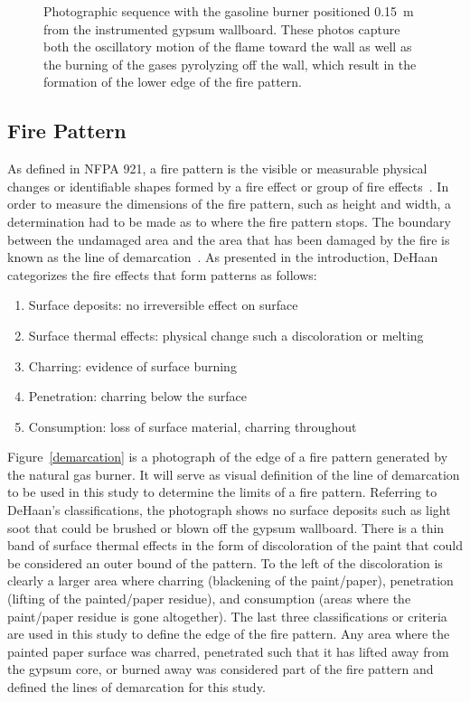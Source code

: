 \documentclass[twoside]{uocthesis}
\begin{document}
{\begin{figure}[p]
	\caption[Photographs of motion of the flame with the gasoline burner positioned 0.15~m from the wall]{Photographic sequence with the gasoline burner positioned 0.15~m from the instrumented gypsum wallboard. These photos capture both the oscillatory motion of the flame toward the wall as well as the burning of the gases pyrolyzing off  the wall, which result in the formation of the lower edge of the fire pattern.}
	\label{IWGBGAS6_seq}
\end{figure}

\subsection{Fire Pattern}

As defined in NFPA 921, a fire pattern is the visible or measurable physical changes or identifiable shapes formed by a fire effect or group of fire effects~\cite{NFPA:921}.  In order to measure the dimensions of the fire pattern, such as height and width, a determination had to be made as to where the fire pattern stops.  The boundary between the undamaged area and the area that has been damaged by the fire is known as the line of demarcation~\cite{NFPA:921}.  As presented in the introduction, DeHaan~\cite{DeHaan:2012} categorizes the fire effects that form patterns as follows:
\begin{enumerate}
	\item Surface deposits: no irreversible effect on surface
	\item Surface thermal effects: physical change such a discoloration or melting
	\item Charring: evidence of surface burning
	\item Penetration: charring below the surface
	\item Consumption: loss of surface material, charring throughout
\end{enumerate}

Figure~\ref{demarcation} is a photograph of the edge of a fire pattern generated by the natural gas burner.  It will serve as visual definition of the line of demarcation to be used in this study to determine the limits of a fire pattern.  Referring to DeHaan's classifications, the photograph shows no surface deposits such as light soot that could be brushed or blown off the gypsum wallboard.  There is a thin band of surface thermal effects in the form of discoloration of the paint that could be considered an outer bound of the pattern. To the left of the discoloration is clearly a larger area where charring (blackening of the paint/paper), penetration (lifting of the painted/paper residue), and consumption (areas where the paint/paper residue is gone altogether).  The last three classifications or criteria are used in this study to define the edge of the fire pattern.  Any area where the painted paper surface was charred, penetrated such that it has lifted away from the gypsum core, or burned away was considered part of the fire pattern and defined the lines of demarcation for this study.

}
\end{document}
